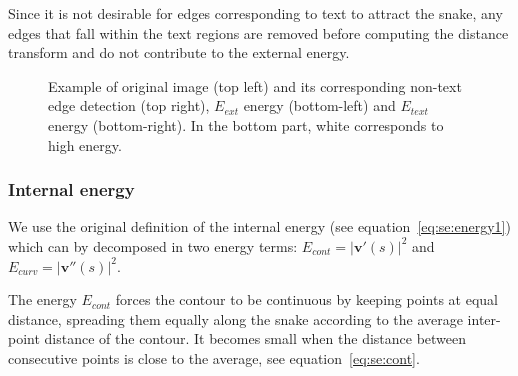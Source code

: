 Since it is not desirable for edges corresponding to text to attract the snake, any edges that fall within the text regions are removed before computing the distance transform and do not contribute to the external energy.
	
	\begin{figure}[!ht]	%
	  \centering
		\caption[Active contour energies for open balloon extraction]{Example of original image (top left) and its corresponding non-text edge detection (top right), $E_{ext}$ energy (bottom-left) and $E_{text}$ energy (bottom-right). In the bottom part, white corresponds to high energy.}
		\label{fig:se:distance_transform}
	\end{figure}

\subsubsection{Internal energy}
We use the original definition of the internal energy (see equation~\ref{eq:se:energy1}) which can by decomposed in two energy terms: $E_{cont} = \left|\mathbf{v}'(s) \right|^2$ and $E_{curv}=\left| \mathbf{v}''(s) \right|^2$.
% 

The energy $E_{cont}$ forces the contour to be continuous by keeping points at equal distance, spreading them equally along the snake according to the average inter-point distance of the contour.
It becomes small when the distance between consecutive points is close to the average, see equation~\ref{eq:se:cont}.

